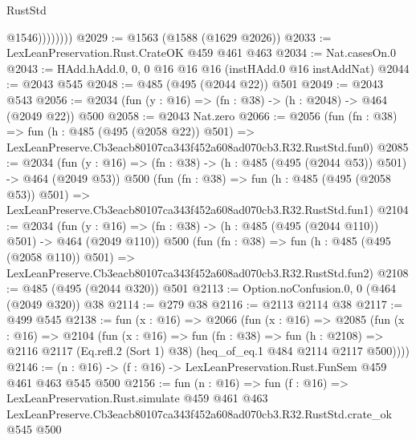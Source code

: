 \begin{lexlean}{RustStd}
\begin{coremodule}
                    @1546))))))))
@2029 := @1563 (@1588 (@1629 @2026))
@2033 := LexLeanPreservation.Rust.CrateOK @459 @461 @463
@2034 := Nat.casesOn.{0}
@2043 := HAdd.hAdd.{0, 0, 0} @16 @16 @16 (instHAdd.{0} @16 instAddNat)
@2044 := @2043 @545
@2048 := @485 (@495 (@2044 @22)) @501
@2049 := @2043 @543
@2056 := @2034 (fun (y : @16) => (fn : @38) -> (h : @2048) -> @464 (@2049 @22)) @500
@2058 := @2043 Nat.zero
@2066 := @2056
    (fun (fn : @38) =>
    fun (h : @485 (@495 (@2058 @22)) @501) =>
    LexLeanPreserve.Cb3eacb80107ca343f452a608ad070cb3.R32.RustStd.fun0)
@2085 := @2034
    (fun (y : @16) => (fn : @38) -> (h : @485 (@495 (@2044 @53)) @501) -> @464 (@2049 @53))
    @500
    (fun (fn : @38) =>
    fun (h : @485 (@495 (@2058 @53)) @501) =>
    LexLeanPreserve.Cb3eacb80107ca343f452a608ad070cb3.R32.RustStd.fun1)
@2104 := @2034
    (fun (y : @16) => (fn : @38) -> (h : @485 (@495 (@2044 @110)) @501) -> @464 (@2049 @110))
    @500
    (fun (fn : @38) =>
    fun (h : @485 (@495 (@2058 @110)) @501) =>
    LexLeanPreserve.Cb3eacb80107ca343f452a608ad070cb3.R32.RustStd.fun2)
@2108 := @485 (@495 (@2044 @320)) @501
@2113 := Option.noConfusion.{0, 0} (@464 (@2049 @320)) @38
@2114 := @279 @38
@2116 := @2113 @2114 @38
@2117 := @499 @545
@2138 := fun (x : @16) =>
  @2066
    (fun (x : @16) =>
    @2085
      (fun (x : @16) =>
      @2104
        (fun (x : @16) =>
        fun (fn : @38) =>
        fun (h : @2108) =>
        @2116 @2117 (Eq.refl.{2} (Sort 1) @38) (heq_of_eq.{1} @484 @2114 @2117 @500))))
@2146 := (n : @16) -> (f : @16) -> LexLeanPreservation.Rust.FunSem @459 @461 @463 @545 @500
@2156 := fun (n : @16) =>
  fun (f : @16) =>
  LexLeanPreservation.Rust.simulate
    @459
    @461
    @463
    LexLeanPreserve.Cb3eacb80107ca343f452a608ad070cb3.R32.RustStd.crate_ok
    @545
    @500
\end{coremodule}
\end{lexlean}
